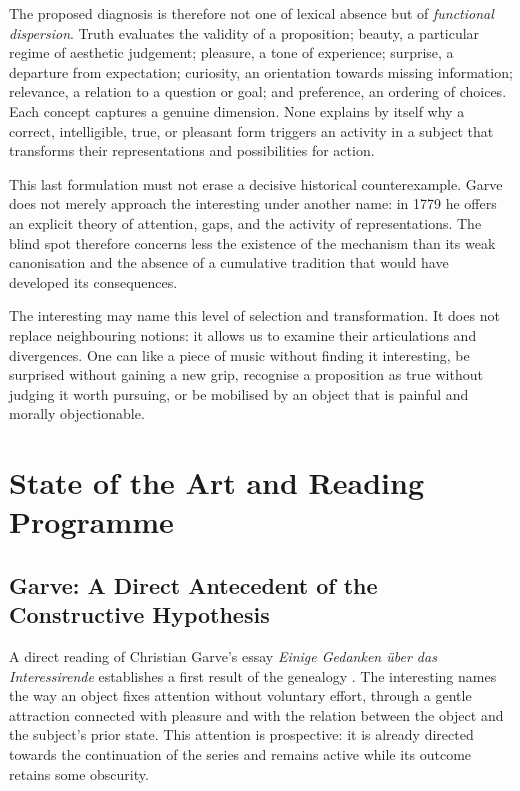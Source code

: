 \documentclass[11pt,a4paper]{article}
\begin{document}
The proposed diagnosis is therefore not one of lexical absence but of
\emph{functional dispersion}. Truth evaluates the validity of a proposition;
beauty, a particular regime of aesthetic judgement; pleasure, a tone of
experience; surprise, a departure from expectation; curiosity, an orientation
towards missing information; relevance, a relation to a question or goal; and
preference, an ordering of choices. Each concept captures a genuine dimension.
None explains by itself why a correct, intelligible, true, or pleasant form
triggers an activity in a subject that transforms their representations and
possibilities for action.

This last formulation must not erase a decisive historical counterexample.
Garve does not merely approach the interesting under another name: in 1779 he
offers an explicit theory of attention, gaps, and the activity of
representations. The blind spot therefore concerns less the existence of the
mechanism than its weak canonisation and the absence of a cumulative tradition
that would have developed its consequences.

The interesting may name this level of selection and transformation. It does
not replace neighbouring notions: it allows us to examine their articulations
and divergences. One can like a piece of music without finding it interesting,
be surprised without gaining a new grip, recognise a proposition as true
without judging it worth pursuing, or be mobilised by an object that is painful
and morally objectionable.

\section{State of the Art and Reading Programme}

\subsection{Garve: A Direct Antecedent of the Constructive Hypothesis}

A direct reading of Christian Garve's essay \emph{Einige Gedanken über das
Interessirende} establishes a first result of the genealogy
\parencite[253--274, 313--317]{garve1779interessirende}. The interesting names
the way an object fixes attention without voluntary effort, through a gentle
attraction connected with pleasure and with the relation between the object and
the subject's prior state. This attention is prospective: it is already
directed towards the continuation of the series and remains active while its
outcome retains some obscurity.
\end{document}
